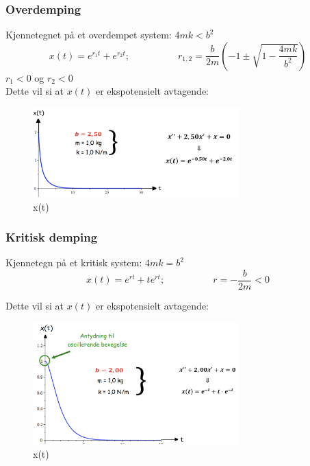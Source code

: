 \documentclass[12pt]{article}
\begin{document}
\subsubsection{Overdemping}
Kjennetegnet på et overdempet system: $4mk < b^2$
$$x(t) = e^{r_1t} + e^{r_2t}; \hspace{5em} r_{1,2} = \frac{b}{2m}\left(-1 \pm \sqrt{1-\frac{4mk}{b^2}}\right)$$
$r_1 < 0$ og $r_2 < 0$\\
Dette vil si at $x(t)$ er ekspotensielt avtagende:
\begin{figure} [H]
    \centering
    \includegraphics[width = 8cm]{images/slow1.png}
    \caption{x(t)}
\end{figure}

\subsubsection{Kritisk demping}
Kjennetegn på et kritisk system: $4mk = b^2$
$$x(t) = e^{rt} + te^{rt}; \hspace{5em} r = -\frac{b}{2m} < 0$$

Dette vil si at $x(t)$ er ekspotensielt avtagende:
\begin{figure} [H]
    \centering
    \includegraphics[width = 8cm]{images/slow2.png}
    \caption{x(t)}
\end{figure}
\end{document}
